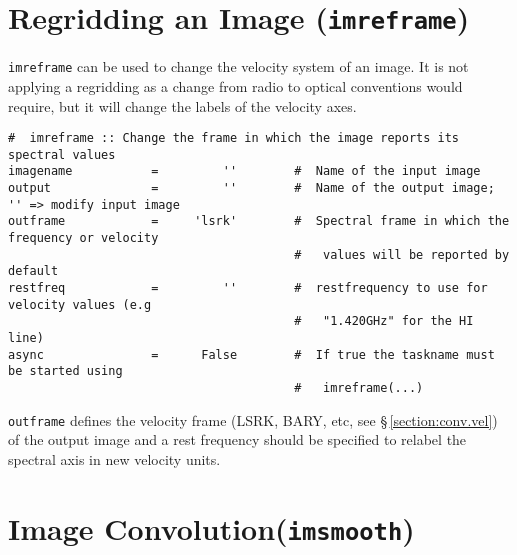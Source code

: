 \section{Regridding an Image ({\tt imreframe})}
\label{section:analysis.reframe}

{\tt imreframe} can be used to change the velocity system of an
image. It is not applying a regridding as a change from radio to
optical conventions would require, but it will change the labels of the
velocity axes. 

\small
\begin{verbatim}
#  imreframe :: Change the frame in which the image reports its spectral values
imagename           =         ''        #  Name of the input image
output              =         ''        #  Name of the output image; '' => modify input image
outframe            =     'lsrk'        #  Spectral frame in which the frequency or velocity
                                        #   values will be reported by default
restfreq            =         ''        #  restfrequency to use for velocity values (e.g
                                        #   "1.420GHz" for the HI line)
async               =      False        #  If true the taskname must be started using
                                        #   imreframe(...)
\end{verbatim}
\normalsize

{\tt outframe} defines the velocity frame  (LSRK, BARY, etc, see
\S\,\ref{section:conv.vel}) of the output image and a rest frequency
should be specified to relabel the spectral axis in new velocity units. 


\section{Image Convolution({\tt imsmooth})}
\label{section:analysis.imsmooth}


